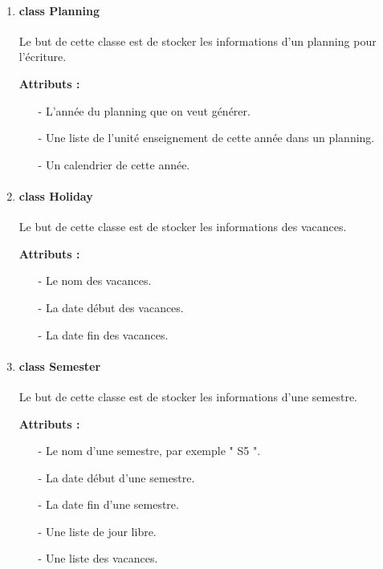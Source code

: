 \documentclass{polytech/polytech}
\begin{document}
\begin{enumerate}
			\item \paragraph{class Planning}

			Le but de cette classe est de stocker les informations d'un planning pour l'écriture.

			\textbf{Attributs :}
				\begin{itemize}
					\item[-] L'année du planning que on veut générer.
					\item[-] Une liste de l'unité enseignement de cette année dans un planning.
					\item[-] Un calendrier de cette année.
				\end{itemize}

			\item \paragraph{class Holiday}

			Le but de cette classe est de stocker les informations des vacances.

			\textbf{Attributs :}
				\begin{itemize}
					\item[-] Le nom des vacances.
					\item[-] La date début des vacances.
					\item[-] La date fin des vacances.
				\end{itemize}

			\item \paragraph{class Semester}

			Le but de cette classe est de stocker les informations d'une semestre.

			\textbf{Attributs :}
				\begin{itemize}
					\item[-] Le nom d'une semestre, par exemple " S5 ".
					\item[-] La date début d'une semestre.
					\item[-] La date fin d'une semestre.
					\item[-] Une liste de jour libre.
					\item[-] Une liste des vacances.
				\end{itemize}
		\end{enumerate}
		\pagebreak
\end{document}
